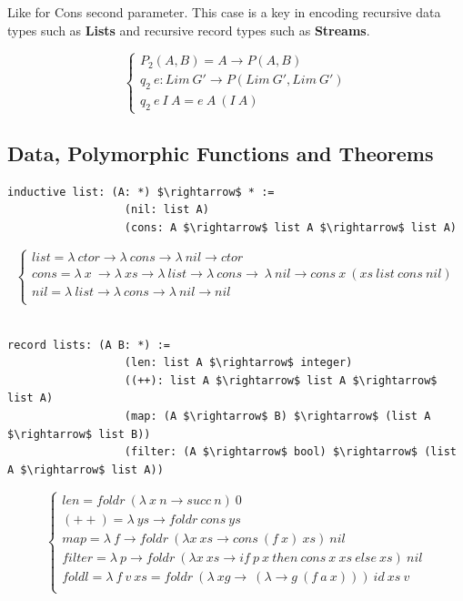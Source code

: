 \documentclass[11pt,oneside]{article}
\begin{document}
Like for Cons second parameter. This case is a key in encoding recursive
   data types such as {\bf Lists} and recursive record types such as {\bf Streams}.

$$
\begin{cases}
P_2(A,B) = A \rightarrow P(A,B) \\
q_2\ e : Lim\ G' \rightarrow P ( Lim\ G',  Lim\ G' ) \\
q_2\ e\ I\ A = e\ A\ (I\ A)
\end{cases}
$$

\newpage
\vspace{0.2cm}
\subsection{Data, Polymorphic Functions and Theorems}
\vspace{0.4cm}

\begin{lstlisting}[mathescape=true]
        inductive list: (A: *) $\rightarrow$ * :=
                  (nil: list A)
                  (cons: A $\rightarrow$ list A $\rightarrow$ list A)
\end{lstlisting}
$$
\begin{cases}
list = \lambda\ ctor \rightarrow \lambda\ cons \rightarrow \lambda\ nil \rightarrow ctor\\
cons = \lambda\ x\ \rightarrow \lambda\ xs \rightarrow \lambda\ list \rightarrow \lambda\ cons \rightarrow\ \lambda\ nil \rightarrow cons\ x\ (xs\ list\ cons\ nil)\\
nil = \lambda\ list \rightarrow \lambda\ cons \rightarrow \lambda\ nil \rightarrow nil\\
\end{cases}
$$
\\
\begin{lstlisting}[mathescape=true]
           record lists: (A B: *) :=
                  (len: list A $\rightarrow$ integer)
                  ((++): list A $\rightarrow$ list A $\rightarrow$ list A)
                  (map: (A $\rightarrow$ B) $\rightarrow$ (list A $\rightarrow$ list B))
                  (filter: (A $\rightarrow$ bool) $\rightarrow$ (list A $\rightarrow$ list A))
\end{lstlisting}
$$
\begin{cases}
len = foldr\ (\lambda\ x\ n \rightarrow succ\ n)\ 0\\
(++) = \lambda\ ys \rightarrow foldr\ cons\ ys\\
map = \lambda\ f \rightarrow foldr\ (\lambda x\ xs \rightarrow cons\ (f\ x)\ xs)\ nil\\
filter = \lambda\ p \rightarrow foldr\ (\lambda x\ xs \rightarrow if\ p\ x\ then\ cons\ x\ xs\ else\ xs)\ nil\\
foldl = \lambda\ f\ v\ xs = foldr\ (\lambda\ xg\rightarrow\ (\lambda \rightarrow g\ (f\ a\ x)))\ id\ xs\ v\\
\end{cases}
$$
\end{document}
